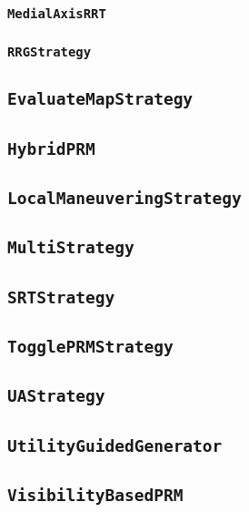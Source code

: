 \subsubsection{\texttt{MedialAxisRRT}}

\subsubsection{\texttt{RRGStrategy}}

\subsection{\texttt{EvaluateMapStrategy}}

\subsection{\texttt{HybridPRM}}

\subsection{\texttt{LocalManeuveringStrategy}}

\subsection{\texttt{MultiStrategy}}

\subsection{\texttt{SRTStrategy}}

\subsection{\texttt{TogglePRMStrategy}}

\subsection{\texttt{UAStrategy}}

\subsection{\texttt{UtilityGuidedGenerator}}

\subsection{\texttt{VisibilityBasedPRM}}

